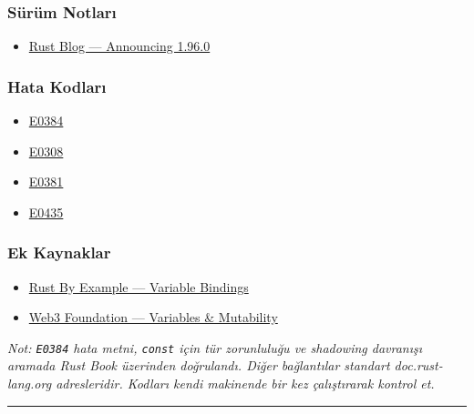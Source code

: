 \documentclass[12pt,a4paper]{article}
\begin{document}
\subsubsection{Sürüm Notları}\label{sürüm-notları-2}

\begin{itemize}
\tightlist
\item
  \href{https://blog.rust-lang.org/2026/05/28/Rust-1.96.0/}{Rust Blog --- Announcing 1.96.0}
\end{itemize}

\subsubsection{Hata Kodları}\label{hata-kodları-2}

\begin{itemize}
\tightlist
\item
  \href{https://doc.rust-lang.org/error_codes/E0384.html}{E0384}
\item
  \href{https://doc.rust-lang.org/error_codes/E0308.html}{E0308}
\item
  \href{https://doc.rust-lang.org/error_codes/E0381.html}{E0381}
\item
  \href{https://doc.rust-lang.org/error_codes/E0435.html}{E0435}
\end{itemize}

\subsubsection{Ek Kaynaklar}\label{ek-kaynaklar-2}

\begin{itemize}
\tightlist
\item
  \href{https://doc.rust-lang.org/rust-by-example/variable_bindings.html}{Rust By Example --- Variable Bindings}
\item
  \href{https://education.web3.foundation/docs/Rust/section2/variables-mutability}{Web3 Foundation --- Variables \& Mutability}
\end{itemize}

\emph{Not: \texttt{E0384} hata metni, \texttt{const} için tür zorunluluğu ve shadowing davranışı aramada Rust Book üzerinden doğrulandı. Diğer bağlantılar standart doc.rust-lang.org adresleridir. Kodları kendi makinende bir kez çalıştırarak kontrol et.}

\begin{center}\rule{0.5\linewidth}{0.5pt}\end{center}
\end{document}
